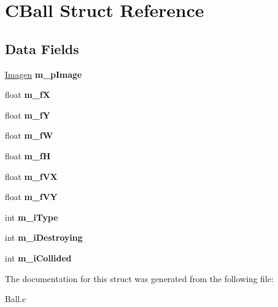 \hypertarget{struct_c_ball}{}\section{C\+Ball Struct Reference}
\label{struct_c_ball}
\subsection*{Data Fields}
\begin{DoxyCompactItemize}
\item 
\mbox{\label{struct_c_ball_a98492333f2055f089e217a2d22161054}} 
\hyperlink{struct_imagen}{Imagen} {\bfseries m\+\_\+p\+Image}
\item 
\mbox{\label{struct_c_ball_a221d126aa350ad923c9379eee7a1fa8f}} 
float {\bfseries m\+\_\+fX}
\item 
\mbox{\label{struct_c_ball_a9275f65862bc85be57c9748f2c11ebb5}} 
float {\bfseries m\+\_\+fY}
\item 
\mbox{\label{struct_c_ball_a7f3ca769df4efa09a1d5b1104c582f31}} 
float {\bfseries m\+\_\+fW}
\item 
\mbox{\label{struct_c_ball_a2d55327447562affae2259e4013101f3}} 
float {\bfseries m\+\_\+fH}
\item 
\mbox{\label{struct_c_ball_ad7ecdaa57af67ac2c0f597c3a352cd93}} 
float {\bfseries m\+\_\+f\+VX}
\item 
\mbox{\label{struct_c_ball_ab233b640d1e62f4605002f8e30495c14}} 
float {\bfseries m\+\_\+f\+VY}
\item 
\mbox{\label{struct_c_ball_ab6abd4eddbf0cd895b02788ee5b796eb}} 
int {\bfseries m\+\_\+i\+Type}
\item 
\mbox{\label{struct_c_ball_ac7f07a775ffe721a9d66defccc4d1faa}} 
int {\bfseries m\+\_\+i\+Destroying}
\item 
\mbox{\label{struct_c_ball_a3637a07a03c98ff6383731b33a9b3fdd}} 
int {\bfseries m\+\_\+i\+Collided}
\end{DoxyCompactItemize}


The documentation for this struct was generated from the following file\+:\begin{DoxyCompactItemize}
\item 
Ball.\+c\end{DoxyCompactItemize}
